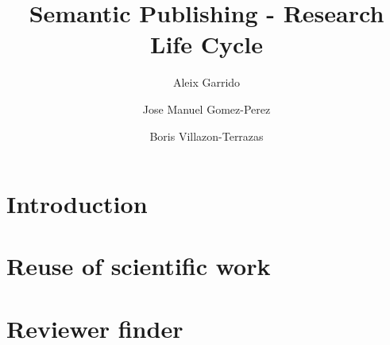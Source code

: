 \documentclass{llncs}
\begin{document}
%
\frontmatter          %
%
\pagestyle{headings}  %
%
%
\mainmatter              %
%
\title{Semantic Publishing - Research Life Cycle}

%
%
\author{Aleix Garrido \and Jose Manuel Gomez-Perez \and Boris Villazon-Terrazas}
%
%
%


\maketitle              %



\begin{abstract}


\end{abstract}

\section{Introduction}\label{sec:Introduction}


\section{Reuse of scientific work}\label{sec:RelatedWork}


\section{Reviewer finder}\label{sec:Motivation}

\end{document}
